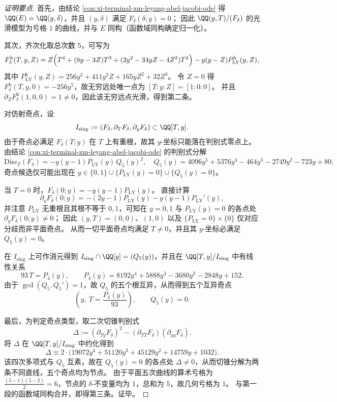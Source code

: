 \begin{proof}[证明要点]
首先，由结论 \ref{con:xi-terminal-zm-leyang-abel-jacobi-ode} 得 \(\QQ(E)=\QQ(y,\delta)\)，并且 \((y,\delta)\) 满足 \(F_\delta(\delta;y)=0\)；
因此 \(\QQ(y,T)/(F_\delta)\) 的光滑模型为亏格 \(1\) 的曲线，并与 \(E\) 同构（函数域同构确定归一化）。

其次，齐次化取总次数 \(5\)，可写为
\[
F_\delta^{\mathrm{h}}(T,y,Z)=
Z\Bigl(T^{4}+(8y-3Z)T^{3}+(2y^{2}-34yZ-4Z^{2})T^{2}\Bigr)-y(y-Z)P_{\mathrm{LY}}^{\mathrm{h}}(y,Z),
\]
其中
\(
P_{\mathrm{LY}}^{\mathrm{h}}(y,Z)=256y^{3}+411y^{2}Z+165yZ^{2}+32Z^{3}
\)。
令 \(Z=0\) 得 \(F_\delta^{\mathrm{h}}(T,y,0)=-256y^{5}\)，故无穷远处唯一点为 \([T:y:Z]=[1:0:0]\)。
并且
\(
\partial_ZF_\delta^{\mathrm{h}}(1,0,0)=1\neq 0
\)，因此该无穷远点光滑，得到第二条。

对仿射奇点，设
\[
I_{\mathrm{sing}}:=(F_\delta,\partial_TF_\delta,\partial_yF_\delta)\subset\QQ[T,y].
\]
由于奇点必满足 \(F_\delta(T;y)\) 在 \(T\) 上有重根，故其 \(y\)-坐标只能落在判别式零点上。
由结论 \ref{con:xi-terminal-zm-leyang-abel-jacobi-ode} 的判别式分解
\[
\mathrm{Disc}_{T}(F_\delta)=-y(y-1)P_{\mathrm{LY}}(y)\,Q_{5}(y)^{2},
\quad
Q_{5}(y)=4096y^{5}+5376y^{4}-464y^{3}-2749y^{2}-723y+80,
\]
奇点候选仅可能出现在 \(y\in\{0,1\}\cup\{P_{\mathrm{LY}}(y)=0\}\cup\{Q_5(y)=0\}\)。

当 \(T=0\) 时，\(F_\delta(0;y)=-y(y-1)P_{\mathrm{LY}}(y)\)。
直接计算
\[
\partial_yF_\delta(0;y)=-(2y-1)P_{\mathrm{LY}}(y)-y(y-1)P_{\mathrm{LY}}'(y),
\]
并注意 \(P_{\mathrm{LY}}\) 无重根且其根不等于 \(0,1\)，可知在 \(y=0,1\) 与 \(P_{\mathrm{LY}}(y)=0\) 的各点处 \(\partial_yF_\delta(0;y)\neq 0\)；
因此 \((y,T)=(0,0)\)、\((1,0)\) 以及 \(\{P_{\mathrm{LY}}=0\}\times\{0\}\) 仅对应分歧而非平面奇点。
从而一切平面奇点均满足 \(T\neq 0\)，并且其 \(y\)-坐标必满足 \(Q_5(y)=0\)。

在 \(I_{\mathrm{sing}}\) 上可作消元得到
\(
I_{\mathrm{sing}}\cap\QQ[y]=(Q_5(y))
\)，并且在 \(\QQ[T,y]/I_{\mathrm{sing}}\) 中有线性关系
\[
93\,T=P_4(y),
\qquad
P_4(y)=8192y^{4}+5888y^{3}-3680y^{2}-2848y+152.
\]
由于 \(\gcd(Q_5,Q_5')=1\)，故 \(Q_5\) 的五个根互异，从而得到五个互异奇点
\[
\left(y,\ T=\frac{P_4(y)}{93}\right),\qquad Q_5(y)=0.
\]

最后，为判定奇点类型，取二次切锥判别式
\[
\Delta:=(\partial_{Ty}F_\delta)^{2}-(\partial_{TT}F_\delta)(\partial_{yy}F_\delta).
\]
将 \(\Delta\) 在 \(\QQ[T,y]/I_{\mathrm{sing}}\) 中约化得到
\[
\Delta\equiv 2\cdot\bigl(19072y^{4}+51120y^{3}+45129y^{2}+14759y+1032\bigr).
\]
该四次多项式与 \(Q_5\) 互素，故在 \(Q_5(y)=0\) 的各点处 \(\Delta\neq 0\)，从而切锥分解为两条不同直线，五个奇点均为节点。
由于平面五次曲线的算术亏格为 \(\frac{(5-1)(5-2)}{2}=6\)，节点的 \(\delta\)-不变量均为 \(1\)，总和为 \(5\)，故几何亏格为 \(1\)。
与第一段的函数域同构合并，即得第三条。证毕。
\end{proof}


